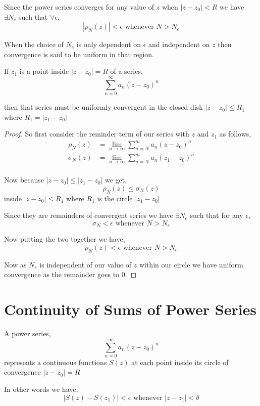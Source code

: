 Since the power series converges for any value of $z$ when $|z - z_0| < R$ we have $\exists N_e$ such that $\forall \epsilon$, 
$$ |\rho_N(z)| < \epsilon \text{ whenever } N > N_e $$ 

When the choice of $N_e$ is only dependent on $\epsilon$ and independent on $z$ then convergence is said to be uniform in that region.


\begin{theorem}
   If $z_1$ is a point inside $| z - z_0| = R$ of a series, 
   $$ \sum_{n=0}^{\infty} a_n(z - z_0)^{n} $$ 

   then that series must be uniformly convergent in the closed disk $| z- z_0| \le R_1$ where $R_1 = |z_1 - z_0|$
\end{theorem}

\begin{proof}
   So first consider the reminder term of our series with $z$ and $z_1$ as follows, 
   \begin{align*}
      \rho_N(z) &= \lim_{n \to \infty} \sum_{n=N}^{m} a_n(z - z_0)^{n}\\
      \sigma_N(z) &= \lim_{n \to \infty} \sum_{n=N}^{m} a_n(z_1 - z_0)^{n}\\
   \end{align*}

   Now because $|z - z_0| \le |z_1 - z_0|$ we get, 
   $$ \rho_N(z) \le \sigma_N(z) $$ inside $|z - z_0| \le R_1$ where $R_1$ is the circle $|z_1 - z_0|$

   Since they are remainders of convergent series we have $\exists N_e$ such that for any $\epsilon$, 
   $$ \sigma_N < \epsilon \text{ whenever } N > N_e $$ 

   Now putting the two together we have, 
   $$ \rho_N(z) < \epsilon \text{ whenever } N > N_e$$ 

   Now as $N_e$ is independent of our value of $z$ within our circle we have uniform convergence as the remainder goes to $0$.
\end{proof}


\section{Continuity of Sums of Power Series}
\begin{theorem}
   A power series, 
   $$ \sum_{n=0}^{\infty} a_n (z - z_0)^{n} $$ represents a continuous functions $S(z)$ at each point inside its circle of convergence $|z - z_0| = R$

   In other words we have, 
   $$ |S(z) - S(z_1)| < \epsilon \text{ whenever } |z  - z_1| < \delta $$ 
\end{theorem}

